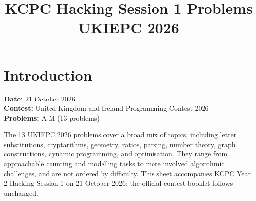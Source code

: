 \documentclass[12pt]{article}
\title{KCPC Hacking Session 1 Problems\\UKIEPC 2026}
\author{}
\date{}
\begin{document}
\maketitle
\thispagestyle{fancy}

\section*{Introduction}
\noindent
\textbf{Date:} 21 October 2026\\
\textbf{Contest:} United Kingdom and Ireland Programming Contest 2026\\
\textbf{Problems:} A-M (13 problems)

\medskip
The 13 UKIEPC 2026 problems cover a broad mix of topics, including letter substitutions, cryptarithms,
geometry, ratios, parsing, number theory, graph constructions, dynamic programming, and optimisation.
They range from approachable counting and modelling tasks to more involved algorithmic challenges, and
are not ordered by difficulty. This sheet accompanies KCPC Year 2 Hacking Session 1 on 21 October 2026;
the official contest booklet follows unchanged.

\clearpage

\end{document}
